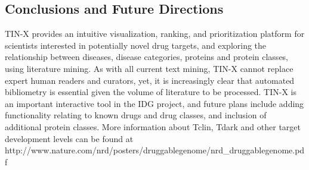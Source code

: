 \subsection{Conclusions and Future Directions}

TIN-X provides an intuitive visualization, ranking, and prioritization platform for scientists interested in potentially novel drug targets, and exploring the relationship between diseases, disease categories, proteins and protein classes, using literature mining.  As with all current text mining, TIN-X cannot replace expert human readers and curators, yet, it is increasingly clear that automated bibliometry is essential given the volume of literature to be processed.  TIN-X is an important interactive tool in the IDG project, and future plans include adding functionality relating to known drugs and drug classes, and inclusion of additional protein classes. More information about Tclin, Tdark and other target development levels can be found at http://www.nature.com/nrd/posters/druggablegenome/nrd\_druggablegenome.pdf
